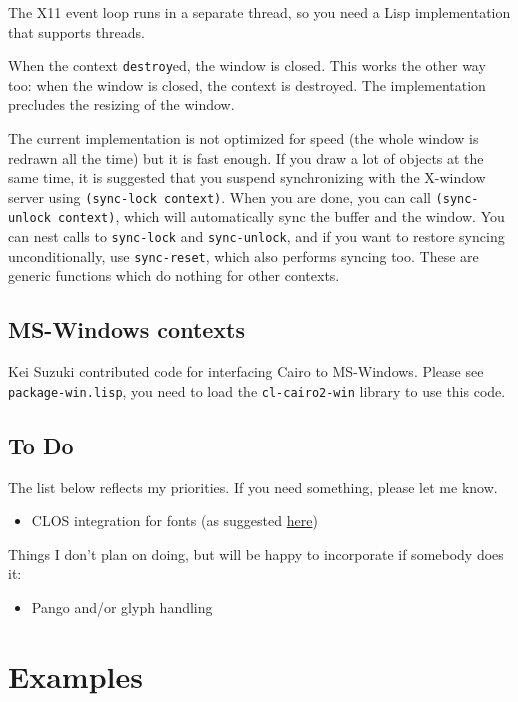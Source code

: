 \documentclass[12pt,letterpaper]{article}
\begin{document}
The X11 event loop runs in a separate thread, so you need a Lisp
implementation that supports threads.  

When the context \lstinline!destroy!ed, the window is closed.  This
works the other way too: when the window is closed, the context is
destroyed.  The implementation precludes the resizing of the window.

The current implementation is not optimized for speed (the whole
window is redrawn all the time) but it is fast enough.  If you draw a
lot of objects at the same time, it is suggested that you suspend
synchronizing with the X-window server using 
\lstinline!(sync-lock context)!.  When you are done, you can call
\lstinline!(sync-unlock context)!, which will automatically sync the
buffer and the window.
You can nest calls to \lstinline!sync-lock!  and
\lstinline!sync-unlock!, and if you want to restore syncing
unconditionally, use \lstinline!sync-reset!, which also performs
syncing too.  These are generic functions which do nothing for other
contexts.

\subsection{MS-Windows contexts}
\label{sec:ms-windows-contexts}

Kei Suzuki contributed code for interfacing Cairo to MS-Windows.
Please see \verb!package-win.lisp!, you need to load the
\lstinline!cl-cairo2-win! library to use this code.

\subsection{To Do}
\label{sec:todo}

The list below reflects my priorities.  If you need something, please
let me know.
\begin{itemize}
\item CLOS integration for fonts (as suggested
  \href{http://www.cairographics.org/manual/bindings-fonts.html}{here})
\end{itemize}

Things I don't plan on doing, but will be happy to incorporate if
somebody does it:
\begin{itemize}
\item Pango and/or glyph handling
\end{itemize}


\section{Examples}
\label{sec:examples}
\end{document}
